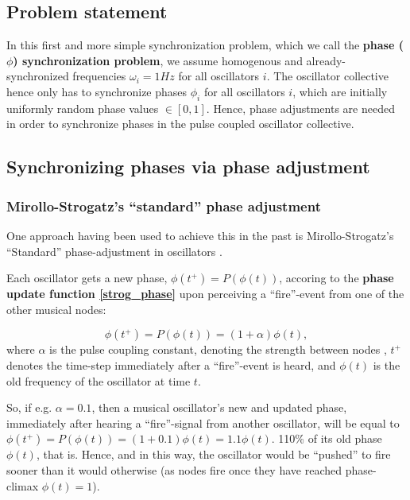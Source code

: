 	\subsection{Problem statement}

	In this first and more simple synchronization problem, which we call the \textbf{phase ($\phi$) synchronization problem}, we assume homogenous and already-synchronized frequencies $\omega_i=1Hz$ for all oscillators $i$. The oscillator collective hence only has to synchronize phases $\phi_i$ for all oscillators $i$, which are initially uniformly random phase values $\in [0,1]$. Hence, phase adjustments are needed in order to synchronize phases in the pulse coupled oscillator collective.

	
	\subsection{Synchronizing phases via phase adjustment}

		\subsubsection{Mirollo-Strogatz's ``standard'' phase adjustment} %
		\label{mirollo_strogatz_phase_adjust}
		
		One approach having been used to achieve this in the past is Mirollo-Strogatz's ``Standard'' phase-adjustment in oscillators \cite{mirollo_strogatz_PCO_synch}.
		
		Each oscillator gets a new phase, $\phi(t^+) = P(\phi(t))$, accoring to the \textbf{phase update function \eqref{strog_phase}} upon perceiving a ``fire''-event from one of the other musical nodes:
		
		\begin{equation}
		\label{strog_phase}
			\phi(t^+) = P(\phi(t)) = (1 + \alpha)\phi(t) ,
		\end{equation} \nl
		where $\alpha$ is the pulse coupling constant, denoting the strength between nodes \cite{nymoen_synch}, $t^+$ denotes the time-step immediately after a ``fire''-event is heard, and $\phi(t)$ is the old frequency of the oscillator at time $t$. 
		
		So, if e.g. $\alpha = 0.1$, then a musical oscillator's new and updated phase, immediately after hearing a ``fire''-signal from another oscillator, will be equal to $\phi(t^+) = P(\phi(t)) = (1 + 0.1)\phi(t) = 1.1\phi(t)$. 110\% of its old phase $\phi(t)$, that is. Hence, and in this way, the oscillator would be ``pushed'' to fire sooner than it would otherwise (as nodes fire once they have reached phase-climax $\phi(t)=1$).


